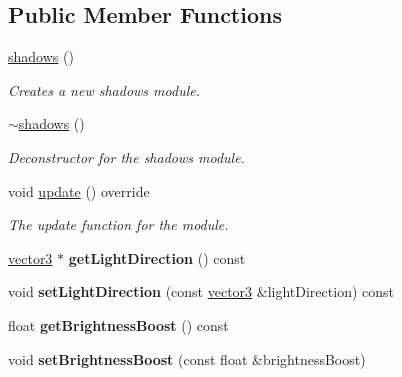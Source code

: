 \subsection*{Public Member Functions}
\begin{DoxyCompactItemize}
\item 
\hyperlink{classflounder_1_1shadows_a64c5f1bbf92b5aefdc071a312c71e403}{shadows} ()
\begin{DoxyCompactList}\small\item\em Creates a new shadows module. \end{DoxyCompactList}\item 
\hyperlink{classflounder_1_1shadows_a1d55b9d191411baa62296650798ebb5a}{$\sim$shadows} ()
\begin{DoxyCompactList}\small\item\em Deconstructor for the shadows module. \end{DoxyCompactList}\item 
void \hyperlink{classflounder_1_1shadows_ab8e8579cf14a761aad81566e98c51dec}{update} () override
\begin{DoxyCompactList}\small\item\em The update function for the module. \end{DoxyCompactList}\item 
\mbox{\label{classflounder_1_1shadows_a08142b9a27c34d9bc2e432dfd85ecc39}} 
\hyperlink{classflounder_1_1vector3}{vector3} $\ast$ {\bfseries get\+Light\+Direction} () const
\item 
\mbox{\label{classflounder_1_1shadows_aaad744a09ce4b14ce15ceaae3bbc0799}} 
void {\bfseries set\+Light\+Direction} (const \hyperlink{classflounder_1_1vector3}{vector3} \&light\+Direction) const
\item 
\mbox{\label{classflounder_1_1shadows_af09b3ae6eebe052bd5756a365248e031}} 
float {\bfseries get\+Brightness\+Boost} () const
\item 
\mbox{\label{classflounder_1_1shadows_afc900a255cfbb9805c3867dfbda50456}} 
void {\bfseries set\+Brightness\+Boost} (const float \&brightness\+Boost)
\item 
\mbox{\label{classflounder_1_1shadows_acbdb246c6dde37014bfaa6085383fefb}} 

\end{DoxyCompactItemize}
